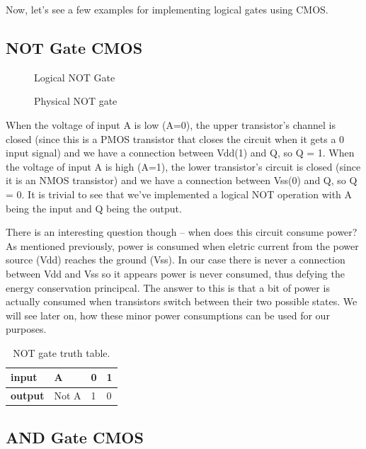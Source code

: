 Now, let's see a few examples for implementing logical gates using CMOS.

\subsection{NOT Gate CMOS}

\begin{figure}[!ht]
    \centering
    
    \caption{Logical NOT Gate} \label{fig:not}
\end{figure}


\begin{figure}[!ht]
    \centering
    
    \caption{Physical NOT gate} \label{fig:circuit9}
\end{figure}

When the voltage of input A is low (A=0), the upper
transistor's channel is closed (since this is a PMOS transistor that closes the circuit when it gets a 0 input signal) and we have a connection between Vdd(1) and Q, so
Q = 1. When the voltage of input A is high (A=1),
the lower transistor's circuit is closed (since it is an NMOS transistor) and we have a connection between Vss(0)
and Q, so Q = 0. It is trivial to see that we've implemented a logical NOT operation with A being the input and Q being the output.

There is an interesting question though – when does this circuit consume power? As mentioned previously, power is consumed when eletric current from the power source (Vdd) reaches the ground (Vss). In our case there is never a connection between Vdd and Vss so it appears power is never consumed, thus defying the energy conservation principcal. The answer to this is that a bit of power is actually consumed when transistors switch between their two possible states. We will see later on, how these minor power consumptions can be used for our purposes.

\begin{table}
    \centering
    \caption{NOT gate truth table.}
    \begin{tabular}{llll}
        \toprule
        \textbf{input}  & A     & 0 & 1 \\ \midrule \textbf{output} & Not A & 1
        & 0 \\ \bottomrule
    \end{tabular}
\end{table} 

\subsection{AND Gate CMOS}


